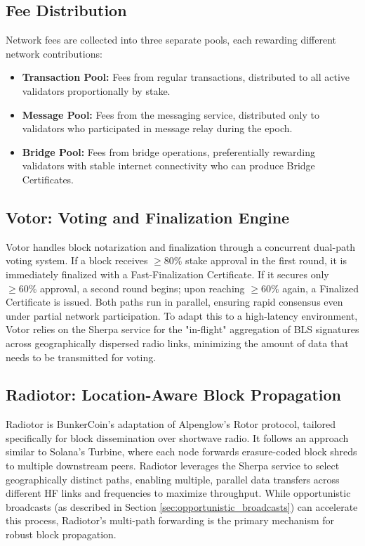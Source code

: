 \documentclass{article}
\begin{document}
\subsection{Fee Distribution}
\label{sec:fees}

Network fees are collected into three separate pools, each rewarding different network contributions:
\begin{itemize}
    \item \textbf{Transaction Pool:} Fees from regular transactions, distributed to all active validators proportionally by stake.
    \item \textbf{Message Pool:} Fees from the messaging service, distributed only to validators who participated in message relay during the epoch.
    \item \textbf{Bridge Pool:} Fees from bridge operations, preferentially rewarding validators with stable internet connectivity who can produce Bridge Certificates.
\end{itemize}

\subsection{Votor: Voting and Finalization Engine}

Votor handles block notarization and finalization through a concurrent dual-path voting system. If a block receives $\geq 80\%$ stake approval in the first round, it is immediately finalized with a Fast-Finalization Certificate. If it secures only $\geq 60\%$ approval, a second round begins; upon reaching $\geq 60\%$ again, a Finalized Certificate is issued. Both paths run in parallel, ensuring rapid consensus even under partial network participation. To adapt this to a high-latency environment, Votor relies on the Sherpa service for the "in-flight" aggregation of BLS signatures across geographically dispersed radio links, minimizing the amount of data that needs to be transmitted for voting.

\subsection{Radiotor: Location-Aware Block Propagation}

Radiotor is BunkerCoin's adaptation of Alpenglow's Rotor protocol, tailored specifically for block dissemination over shortwave radio. It follows an approach similar to Solana's Turbine, where each node forwards erasure-coded block shreds to multiple downstream peers. Radiotor leverages the Sherpa service to select geographically distinct paths, enabling multiple, parallel data transfers across different HF links and frequencies to maximize throughput. While opportunistic broadcasts (as described in Section \ref{sec:opportunistic_broadcasts}) can accelerate this process, Radiotor's multi-path forwarding is the primary mechanism for robust block propagation.
\end{document}
